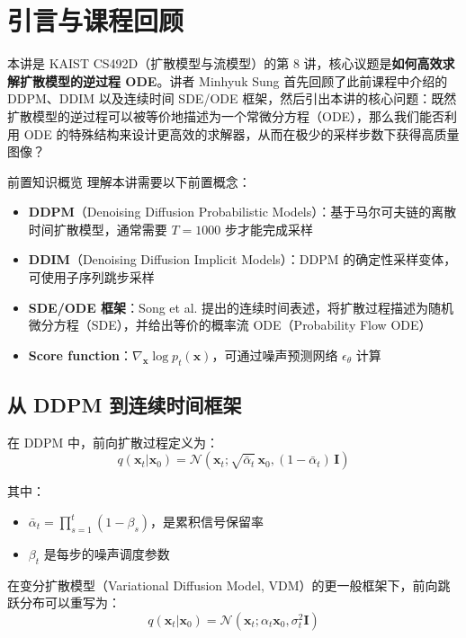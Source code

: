 \section{引言与课程回顾}

本讲是 KAIST CS492D（扩散模型与流模型）的第 8 讲，核心议题是\textbf{如何高效求解扩散模型的逆过程 ODE}。讲者 Minhyuk Sung 首先回顾了此前课程中介绍的 DDPM、DDIM 以及连续时间 SDE/ODE 框架，然后引出本讲的核心问题：既然扩散模型的逆过程可以被等价地描述为一个常微分方程（ODE），那么我们能否利用 ODE 的特殊结构来设计更高效的求解器，从而在极少的采样步数下获得高质量图像？

\begin{knowledgebox}{前置知识概览}
理解本讲需要以下前置概念：
\begin{itemize}
    \item \textbf{DDPM}（Denoising Diffusion Probabilistic Models）：基于马尔可夫链的离散时间扩散模型，通常需要 $T=1000$ 步才能完成采样
    \item \textbf{DDIM}（Denoising Diffusion Implicit Models）：DDPM 的确定性采样变体，可使用子序列跳步采样
    \item \textbf{SDE/ODE 框架}：Song et al. 提出的连续时间表述，将扩散过程描述为随机微分方程（SDE），并给出等价的概率流 ODE（Probability Flow ODE）
    \item \textbf{Score function}：$\nabla_{\mathbf{x}} \log p_t(\mathbf{x})$，可通过噪声预测网络 $\epsilon_\theta$ 计算
\end{itemize}
\end{knowledgebox}

\subsection{从 DDPM 到连续时间框架}

在 DDPM 中，前向扩散过程定义为：
$$q(\mathbf{x}_t | \mathbf{x}_0) = \mathcal{N}(\mathbf{x}_t; \sqrt{\bar{\alpha}_t}\, \mathbf{x}_0, (1 - \bar{\alpha}_t)\, \mathbf{I})$$

其中：
\begin{itemize}
    \item $\bar{\alpha}_t = \prod_{s=1}^{t} (1 - \beta_s)$，是累积信号保留率
    \item $\beta_t$ 是每步的噪声调度参数
\end{itemize}

在变分扩散模型（Variational Diffusion Model, VDM）的更一般框架下，前向跳跃分布可以重写为：
$$q(\mathbf{x}_t | \mathbf{x}_0) = \mathcal{N}(\mathbf{x}_t; \alpha_t \mathbf{x}_0, \sigma_t^2 \mathbf{I})$$

